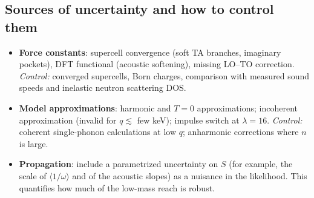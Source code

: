 \documentclass[11pt,a4paper]{article}
\numberwithin{equation}{section}
\newcommand{\avg}[1]{\langle #1\rangle}
\begin{document}
\subsection{Sources of uncertainty and how to control them}
\begin{itemize}
  \item \textbf{Force constants}: supercell convergence (soft TA branches, imaginary pockets),
  DFT functional (acoustic softening), missing LO--TO correction. \emph{Control:} converged
  supercells, Born charges, comparison with measured sound speeds and inelastic neutron
  scattering DOS.
  \item \textbf{Model approximations}: harmonic and $T=0$ approximations; incoherent
  approximation (invalid for $q\lesssim$ few keV); impulse switch at $\lambda=16$.
  \emph{Control:} coherent single-phonon calculations at low $q$; anharmonic corrections where
  $n$ is large.
  \item \textbf{Propagation}: include a parametrized uncertainty on $S$ (for example, the scale
  of $\avg{1/\omega}$ and of the acoustic slopes) as a nuisance in the likelihood. This
  quantifies how much of the low-mass reach is robust.
\end{itemize}

\end{document}
